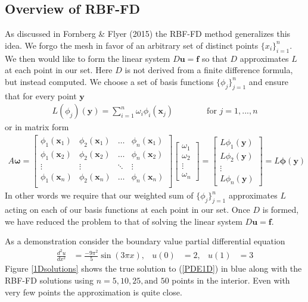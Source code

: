 \documentclass[12pt]{article}
\let\vec\mathbf
\begin{document}
\subsection{Overview of RBF-FD}	\label{sec_overview_rbffd}
As discussed in Fornberg \& Flyer (2015)\cite{Fornberg2015} the RBF-FD method generalizes this idea. We forgo the mesh in favor of an arbitrary set of distinct points $\{x_i\}_{i=1}^n$. We then would like to form the linear system $D\vec{u} = \vec{f}$ so that $D$ approximates $L$ at each point in our set. Here $D$ is not derived from a finite difference formula, but instead computed. We choose a set of basis functions $\{\phi_j\}_{j=1}^n$ and ensure that for every point $\vec{y}$
\begin{align}
L(\phi_j)(\vec{y}) = \sum\limits_{i=1}^{n} \omega_{i} \phi_i(\vec{x}_j) \phantom{===} \text{for } j=1,...,n \label{row_coef}
\end{align}
or in matrix form
\begin{align} \label{Amat}
A\vec{\omega} = 
\begin{bmatrix}
	\phi_1(\vec{x}_1) & \phi_2(\vec{x}_1) & \dots & \phi_n(\vec{x}_1) \\
	\phi_1(\vec{x}_2) & \phi_2(\vec{x}_2) & \dots & \phi_n(\vec{x}_2) \\
	\vdots 			  & \vdots 			  & \ddots & \vdots \\
	\phi_1(\vec{x}_n) & \phi_2(\vec{x}_n) & \dots & \phi_n(\vec{x}_n) \\
\end{bmatrix}
\begin{bmatrix}
	\omega_1 \\ \omega_2 \\ \vdots \\ \omega_n
\end{bmatrix}
=
\begin{bmatrix}
L\phi_1(\vec{y}) \\ L\phi_2(\vec{y}) \\ \vdots \\ L\phi_n(\vec{y})
\end{bmatrix}
= L\vec{\phi}(\vec{y}) 
\end{align}
In other words we require that our weighted sum of $\{\phi_j\}_{j=1}^n$ approximates $L$ acting on each of our basis functions at each point in our set. Once $D$ is formed, we have reduced the problem to that of solving the linear system $D\vec{u} = \vec{f}$. \bigbreak

As a demonstration consider the boundary value partial differential equation
\begin{align}
\frac{d^2u}{dx^2} &= \frac{-9\pi^2}{5}\sin(3\pi x), & u(0)&=2, & u(1)&=3 \label{PDE1D}
\end{align}
Figure \ref{1Dsolutions} shows the true solution to (\ref{PDE1D}) in blue along with the RBF-FD solutions using $n=5,10,25, \text{and } 50$ points in the interior. Even with very few points the approximation is quite close. \bigbreak
\end{document}
